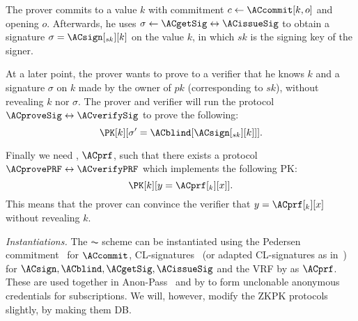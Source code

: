 The prover commits to a value \(k\) with commitment \(c\gets \ACcommit[k, o]\) and opening \(o\).
Afterwards, he uses \(\sigma\gets \ACgetSig\leftrightarrow \ACissueSig\) to obtain a signature \(\sigma = \ACsign[_{sk}][k]\) on the value \(k\), in which \(sk\) is the signing key of the signer.

At a later point, the prover wants to prove to a verifier that he knows \(k\) and a signature \(\sigma\) on \(k\) made by the owner of \(pk\) (corresponding to \(sk\)), \ie without revealing \(k\) nor \(\sigma\).
The prover and verifier will run the protocol \(\ACproveSig\leftrightarrow 
  \ACverifySig\) to prove the following:
\begin{equation*}
  \PK[k][\sigma' = \ACblind[\ACsign[_{sk}][k]]].
\end{equation*}


Finally we need , \(\ACprf\), such that there exists a protocol \(\ACprovePRF\leftrightarrow \ACverifyPRF\) which implements the following 
\ac{PK}:
\begin{equation*}
  \PK[k][y = \ACprf[_k][x]].
\end{equation*}
This means that the prover can convince the verifier that \(y = \ACprf[_k][x]\) without revealing \(k\).


\emph{Instantiations.}
The \(\AC\) scheme can be instantiated using the Pedersen 
commitment~\cite{PedersenCommitment} for \(\ACcommit\),
CL-signatures~\cite{CLsignatures} (or adapted CL-signatures as 
in~\cite{AnonPass}) for \(\ACsign, \ACblind, \ACgetSig, \ACissueSig\) and
the \ac{VRF} by \citet{DY-VRF} as \(\ACprf\).
These are used together in \eg Anon-Pass~\cite{AnonPass} and by 
\citet{HowToWinTheCloneWars} to form unclonable anonymous credentials for 
subscriptions.
We will, however, modify the \ac{ZKPK} protocols slightly, by making them 
\acl{DB}.
